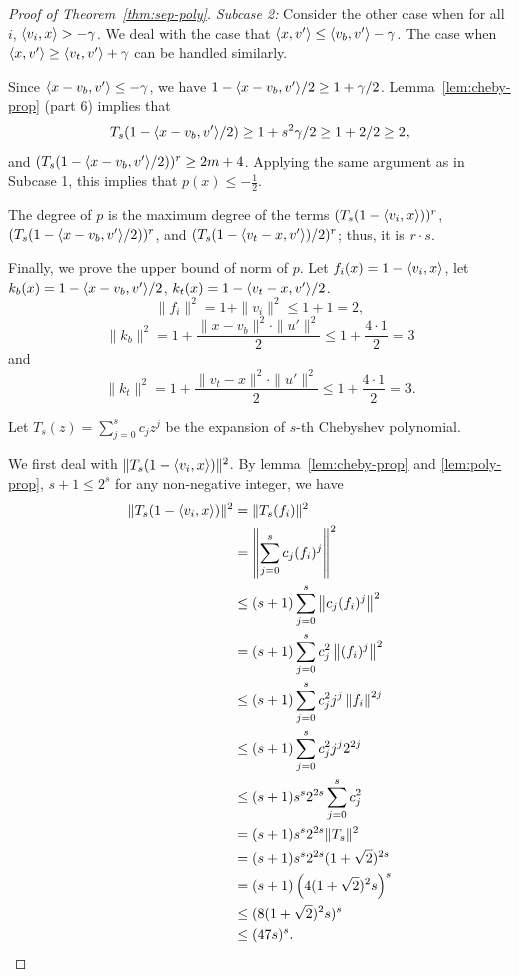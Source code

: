 \begin{proof}[Proof of Theorem~\ref{thm:sep-poly}]
{\em Subcase 2:} Consider the other case when for all $i$, $\langle v_i,x\rangle > -\gamma$.
We deal with the case that $\langle x,v'\rangle \leq \langle v_b,v'\rangle-\gamma$.  
The case when $\langle x,v'\rangle \geq \langle v_t,v'\rangle+\gamma$ can be handled similarly.

Since $\langle x-v_b,v'\rangle \leq -\gamma$, we have $1-\langle x-v_b,v'\rangle/2\geq 1 + \gamma/2$.
Lemma~\ref{lem:cheby-prop} (part 6) implies that
\[
  T_s(1-\langle x-v_b,v'\rangle/2)\geq 1+s^2\gamma/2 \geq 1+2/2 \geq 2,
\]
and $(T_s(1-\langle x-v_b,v'\rangle/2))^r\geq 2m+4$.  
Applying the same argument as in Subcase 1, this implies that $p(x)\leq-\frac{1}{2}$.

The degree of $p$ is the maximum degree of the terms $(T_s(1-\langle v_i,x\rangle))^r$, $(T_s(1-\langle x-v_b,v'\rangle/2))^r$, and $(T_s(1-\langle v_t-x,v'\rangle)/2)^r$; thus, it is $r\cdot s$.

Finally, we prove the upper bound of norm of $p$. Let $f_i(x)=1-\langle v_i,x\rangle$, 
let $k_b(x)=1-\langle x-v_b,v'\rangle/2$, $k_t(x)=1-\langle v_t-x,v'\rangle/2$.
\[
\|f_i\|^2=1+\|v_i\|^2\leq 1+1=2,
\]
\[
\|k_b\|^2=1+\frac{\|x-v_b\|^2\cdot\|u'\|^2}{2}\leq 1+\frac{4\cdot1}{2}=3
\]
and
\[
\|k_t\|^2=1+\frac{\|v_t-x\|^2\cdot\|u'\|^2}{2}\leq 1+\frac{4\cdot1}{2}=3.
\]

Let $T_s(z)=\sum_{j=0}^s c_j z^j$ be the expansion of $s$-th Chebyshev polynomial.

We first deal with $\|T_s(1-\langle v_i,x\rangle)\|^2$.
By lemma~\ref{lem:cheby-prop} and \ref{lem:poly-prop}, $s+1\leq2^s$ for any non-negative integer, we have
\begin{align*}
    \|T_s(1-\langle v_i,x\rangle)\|^2 &= \|T_s(f_i)\|^2 \\
    &=\left\|\sum_{j=0}^s c_j(f_i)^j\right\|^2 \\
    &\leq (s+1)\sum_{j=0}^s\left\| c_j(f_i)^j\right\|^2 \\
    &=(s+1)\sum_{j=0}^s c_j^2\left\|(f_i)^j\right\|^2 \\
    &\leq (s+1)\sum_{j=0}^s c_j^2j^j\left\|f_i\right\|^{2j} \\
    &\leq (s+1)\sum_{j=0}^s c_j^2j^j2^{2j} \\
    &\leq (s+1)s^s2^{2s}\sum_{j=0}^s c_j^2 \\
    &=(s+1)s^s2^{2s}\|T_s\|^2 \\
    &=(s+1)s^s2^{2s}(1+\sqrt{2})^{2s} \\
    &=(s+1)\left(4(1+\sqrt{2})^2s\right)^s \\
    &\leq (8(1+\sqrt{2})^2s)^s \\
    &\leq (47s)^s.
\end{align*}


\end{proof}
